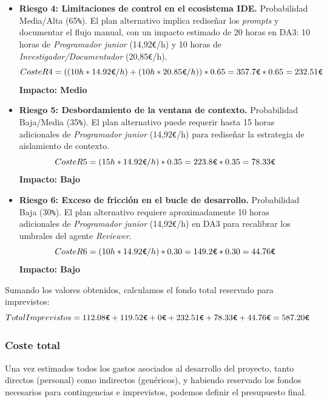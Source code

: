 \documentclass[11pt, letterpaper]{article}
\begin{document}
\begin{itemize}
    \item \textbf{Riesgo 4: Limitaciones de control en el ecosistema IDE.} Probabilidad Media/Alta (65\verb|%|). El plan alternativo implica rediseñar los \textit{prompts} y documentar el flujo manual, con un impacto estimado de 20 horas en DA3: 10 horas de \textit{Programador junior} (14,92\verb|€|/h) y 10 horas de \textit{Investigador/Documentador} (20,85\verb|€|/h).
    \begin{equation*}
        Coste R4 = ((10h * 14{.}92\verb|€|/h) + (10h * 20{.}85\verb|€|/h)) * 0{.}65 = 357{.}7\verb|€| * 0{.}65 = 232{.}51\verb|€|
    \end{equation*}
    \textbf{Impacto: Medio}

    \item \textbf{Riesgo 5: Desbordamiento de la ventana de contexto.} Probabilidad Baja/Media (35\verb|%|). El plan alternativo puede requerir hasta 15 horas adicionales de \textit{Programador junior} (14,92\verb|€|/h) para rediseñar la estrategia de aislamiento de contexto.
    \begin{equation*}
        Coste R5 = (15h * 14{.}92\verb|€|/h) * 0{.}35 = 223{.}8\verb|€| * 0{.}35 = 78{.}33\verb|€|
    \end{equation*}
    \textbf{Impacto: Bajo}

    \item \textbf{Riesgo 6: Exceso de fricción en el bucle de desarrollo.} Probabilidad Baja (30\verb|%|). El plan alternativo requiere aproximadamente 10 horas adicionales de \textit{Programador junior} (14,92\verb|€|/h) en DA3 para recalibrar los umbrales del agente \textit{Reviewer}.
    \begin{equation*}
        Coste R6 = (10h * 14{.}92\verb|€|/h) * 0{.}30 = 149{.}2\verb|€| * 0{.}30 = 44{.}76\verb|€|
    \end{equation*}
    \textbf{Impacto: Bajo}
\end{itemize}

Sumando los valores obtenidos, calculamos el fondo total reservado para imprevistos:
\begin{equation}
    Total Imprevistos = 112{.}08\verb|€| + 119{.}52\verb|€| + 0\verb|€| + 232{.}51\verb|€| + 78{.}33\verb|€| + 44{.}76\verb|€| = 587{.}20\verb|€|
\end{equation}

\subsubsection{Coste total}
\label{sec:coste_total}
Una vez estimados todos los gastos asociados al desarrollo del proyecto, tanto directos (personal) como indirectos (genéricos), y habiendo reservado los fondos necesarios para contingencias e imprevistos, podemos definir el presupuesto final. 
\end{document}
